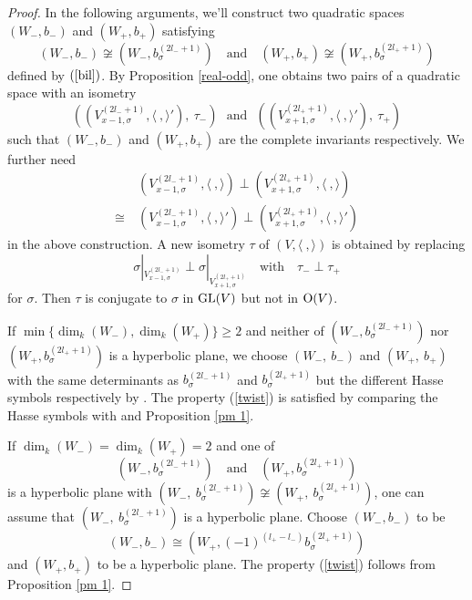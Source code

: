 \documentclass[12pt]{amsart}
\begin{document}
\begin{proof}
In the following arguments, we'll construct two quadratic spaces $(W_-, b_-)$ and $(W_+, b_+)$ satisfying
 $$(W_-, b_-) \not \cong (W_-,  b_{\sigma}^{(2l_-+1)})  \ \ \ \text{ and } \ \ \ (W_+, b_+) \not \cong (W_+,  b_{\sigma}^{(2l_++1)}) $$ 
 defined by $(\ref{bil})$. By Proposition \ref{real-odd},  one obtains two pairs of a quadratic space with an isometry 
  $$((V_{x-1, \sigma}^{(2l_-+1)} , \langle \ , \rangle '), \  \tau_-) \ \ \ \text{and} \ \ \  ((V_{x+1, \sigma}^{(2l_++1)} , \langle \ , \rangle '), \ \tau_+) $$ 
 such that $(W_-, b_-)$ and $(W_+, b_+)$ are the complete invariants respectively. We further need 
  \begin{equation} \label{twist}   \begin{aligned} & (V_{x-1, \sigma}^{(2l_-+1)} , \langle \ , \rangle )\perp (V_{x+1, \sigma}^{(2l_+ +1)} , \langle \ , \rangle)  \\
  \cong \ & (V_{x-1, \sigma}^{(2l_-+1)} , \langle \ , \rangle ') \perp (V_{x+1, \sigma}^{(2l_+ +1)} , \langle \ , \rangle ') \end{aligned}  \end{equation}
 in the above construction. A new isometry $\tau$ of $(V, \langle \ , \rangle)$ is obtained by replacing $$\sigma|_{V_{x-1, \sigma}^{(2l_-+1)}} \perp \sigma |_{V_{x+1, \sigma}^{(2l_+ +1)}} \ \ \ \text{ with } \ \ \ \tau_-\perp \tau_+$$ for $\sigma$. Then $\tau$ is conjugate to $\sigma$ in ${\rm GL}(V)$ but not in ${\rm O}(V)$.
 
 
If $ \min \{ \dim_k (W_-),  \dim_k (W_{+})\} \geq 2 $
 and neither of $(W_-,  b_{\sigma}^{(2l_-+1)})$ nor $(W_+,  b_{\sigma}^{(2l_++1)})$ is a hyperbolic plane, we choose
 $ (W_-, \ b_-)$ and $(W_+, \ b_+)$ with the same determinants as $b_{\sigma}^{(2l_-+1)}$ and $b_{\sigma}^{(2l_++1)}$ but the different Hasse symbols respectively by \cite[63:22.  Theorem]{OM}. The property (\ref{twist}) is satisfied by comparing the Hasse symbols with \cite[58:3 Remark]{OM} and Proposition \ref{pm 1}. 

 If $\dim_k (W_-)=\dim_k (W_{+})=2$ and one of $$ (W_-,  b_{\sigma}^{(2l_-+1)}) \ \ \ \text{ and } \ \ \ (W_+,  b_{\sigma}^{(2l_++1)})$$ is a hyperbolic plane with $(W_-, \ b_{\sigma}^{(2l_-+1)}) \not \cong (W_+, \ b_{\sigma}^{(2l_++1)}) $,  one can assume that $(W_-, \ b_{\sigma}^{(2l_-+1)})$ is a hyperbolic plane. Choose $(W_-, b_-)$ to be $$(W_-, b_-) \cong (W_+, (-1)^{(l_+ - l_-)} b_\sigma^{(2l_++1)})$$ and $(W_+, b_+)$ to be a hyperbolic plane. The property (\ref{twist}) follows from Proposition \ref{pm 1}. 
 

\end{proof}
\end{document}
